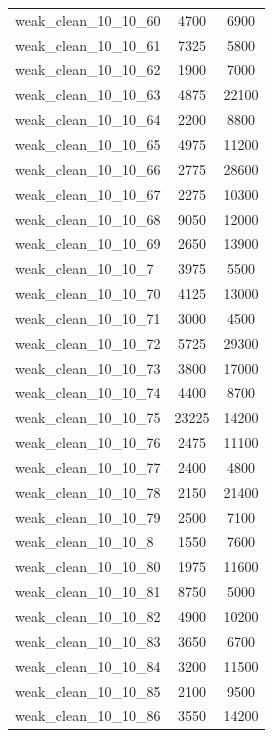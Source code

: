 \begin{longtable}{lcc}
weak\_clean\_10\_10\_60    &     4700 &   6900 \\
weak\_clean\_10\_10\_61    &     7325 &   5800 \\
weak\_clean\_10\_10\_62    &     1900 &   7000 \\
weak\_clean\_10\_10\_63    &     4875 &  22100 \\
weak\_clean\_10\_10\_64    &     2200 &   8800 \\
weak\_clean\_10\_10\_65    &     4975 &  11200 \\
weak\_clean\_10\_10\_66    &     2775 &  28600 \\
weak\_clean\_10\_10\_67    &     2275 &  10300 \\
weak\_clean\_10\_10\_68    &     9050 &  12000 \\
weak\_clean\_10\_10\_69    &     2650 &  13900 \\
weak\_clean\_10\_10\_7     &     3975 &   5500 \\
weak\_clean\_10\_10\_70    &     4125 &  13000 \\
weak\_clean\_10\_10\_71    &     3000 &   4500 \\
weak\_clean\_10\_10\_72    &     5725 &  29300 \\
weak\_clean\_10\_10\_73    &     3800 &  17000 \\
weak\_clean\_10\_10\_74    &     4400 &   8700 \\
weak\_clean\_10\_10\_75    &    23225 &  14200 \\
weak\_clean\_10\_10\_76    &     2475 &  11100 \\
weak\_clean\_10\_10\_77    &     2400 &   4800 \\
weak\_clean\_10\_10\_78    &     2150 &  21400 \\
weak\_clean\_10\_10\_79    &     2500 &   7100 \\
weak\_clean\_10\_10\_8     &     1550 &   7600 \\
weak\_clean\_10\_10\_80    &     1975 &  11600 \\
weak\_clean\_10\_10\_81    &     8750 &   5000 \\
weak\_clean\_10\_10\_82    &     4900 &  10200 \\
weak\_clean\_10\_10\_83    &     3650 &   6700 \\
weak\_clean\_10\_10\_84    &     3200 &  11500 \\
weak\_clean\_10\_10\_85    &     2100 &   9500 \\
weak\_clean\_10\_10\_86    &     3550 &  14200 \\

\end{longtable}
